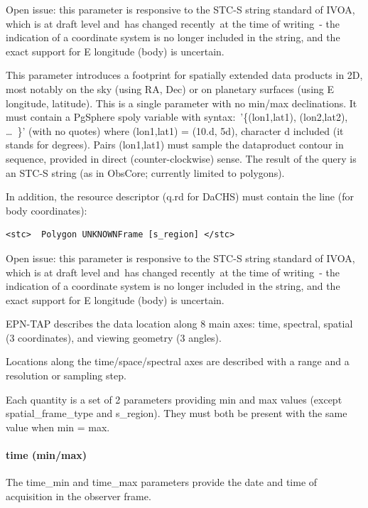 \documentclass[11pt,a4paper]{ivoa}
\begin{document}
Open issue: this parameter is responsive to the STC-S string standard of IVOA, which is at draft level and has changed recently at the time of writing - the indication of a coordinate system is no longer included in the string, and the exact support for E longitude (body) is uncertain.

This parameter introduces a footprint for spatially extended data products in 2D, most notably on the sky (using RA, Dec) or on planetary surfaces (using E longitude, latitude). This is a single parameter with no min/max declinations. It must contain a PgSphere spoly variable with syntax: '\{(lon1,lat1), (lon2,lat2), … \}' (with no quotes) where (lon1,lat1) = (10.d, 5d), character d included (it stands for degrees). Pairs (lon1,lat1) must sample the dataproduct contour in sequence, provided in direct (counter-clockwise) sense. The result of the query is an STC-S string (as in ObsCore; currently limited to polygons).

In addition, the resource descriptor (q.rd for DaCHS) must contain the line (for body coordinates):






\begin{verbatim}
<stc>  Polygon UNKNOWNFrame [s_region] </stc>
\end{verbatim}




Open issue: this parameter is responsive to the STC-S string standard of IVOA, which is at draft level and has changed recently at the time of writing - the indication of a coordinate system is no longer included in the string, and the exact support for E longitude (body) is uncertain.

EPN-TAP describes the data location along 8 main axes: time, spectral, spatial (3 coordinates), and viewing geometry (3 angles). 

Locations along the time/space/spectral axes are described with a range and a resolution or sampling step. 

Each quantity is a set of 2 parameters providing min and max values (except spatial\_frame\_type and s\_region). They must both be present with the same value when min = max.

\paragraph{time (min/max)}

The time\_min and time\_max parameters provide the date and time of acquisition in the observer frame. 
\end{document}
